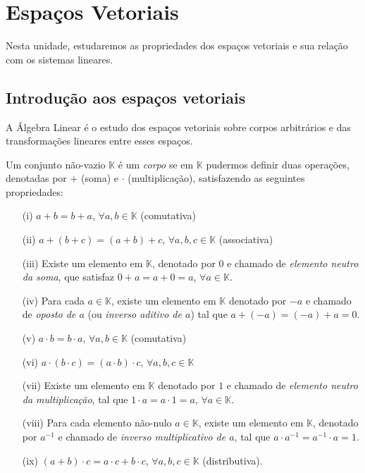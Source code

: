 \chapter{Espaços Vetoriais}

Nesta unidade, estudaremos as propriedades dos espaços vetoriais e sua relação com os sistemas lineares.

\section{Introdução aos espaços vetoriais}

A Álgebra Linear é o estudo dos espaços vetoriais sobre corpos arbitrários e das transformações lineares entre esses espaços.

\begin{defi}
  Um conjunto não-vazio ${\mathbb{K}}$ é um \emph{corpo} se em ${\mathbb{K}}$ pudermos definir duas operações, denotadas por $+$ (soma) e $\cdot$ (multiplicação), satisfazendo as seguintes propriedades:
  \begin{itemize}
  \item[(i)] $a+b=b+a$, $\forall a, b \in {\mathbb{K}}$ (comutativa)
  \item[(ii)] $a+(b+c) = (a+b)+c$, $\forall a, b, c \in {\mathbb{K}}$ (associativa)
  \item[(iii)] Existe um elemento em ${\mathbb{K}}$, denotado por $0$ e chamado de \emph{elemento neutro da soma}, que satisfaz $0+a=a+0=a$, $\forall a \in {\mathbb{K}}$.
  \item[(iv)] Para cada $a\in {\mathbb{K}}$, existe um elemento em ${\mathbb{K}}$ denotado por $-a$ e chamado de \emph{oposto de $a$} (ou \emph{inverso aditivo de $a$}) tal que $a+(-a)=(-a)+a = 0$.
  \item[(v)] $a\cdot b = b\cdot a$, $\forall a, b \in {\mathbb{K}}$ (comutativa)
  \item[(vi)] $a\cdot(b\cdot c) = (a\cdot b)\cdot c$, $\forall a, b, c \in {\mathbb{K}}$
  \item[(vii)] Existe um elemento em ${\mathbb{K}}$ denotado por $1$ e chamado de \emph{elemento neutro da multiplicação}, tal que $1\cdot a = a\cdot 1 = a$, $\forall a \in {\mathbb{K}}$.
  \item[(viii)] Para cada elemento não-nulo $a\in {\mathbb{K}}$, existe um elemento em ${\mathbb{K}}$, denotado por $a^{-1}$ e chamado de \emph{inverso multiplicativo de $a$}, tal que $a\cdot a^{-1}=a^{-1}\cdot a = 1$.
  \item[(ix)] $(a+b)\cdot c = a\cdot c + b\cdot c$, $\forall a, b, c \in {\mathbb{K}}$ (distributiva).
  \end{itemize}
\end{defi}

